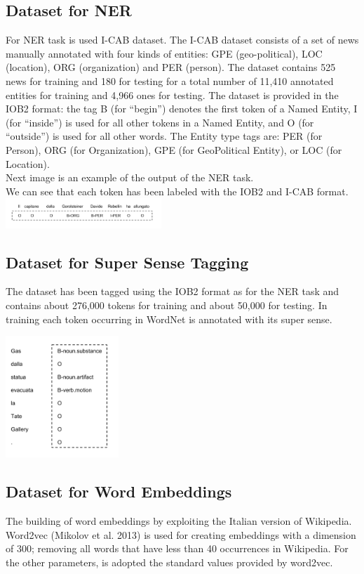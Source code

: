 \documentclass[twocolumn,10pt]{wmrDoc}
\begin{document}
\subsection{Dataset for NER}
For NER task is used I-CAB dataset. The I-CAB dataset consists of a set of news manually annotated
with four kinds of entities: GPE (geo-political), LOC (location), ORG (organization) and
PER (person). The dataset contains 525 news for training and 180 for testing for a total
number of 11,410 annotated entities for training and 4,966 ones for testing. The dataset
is provided in the IOB2 format: the tag B (for “begin”) denotes the first token of a
Named Entity, I (for “inside”) is used for all other tokens in a Named Entity, and O
(for “outside”) is used for all other words. The Entity type tags are: PER (for Person),
ORG (for Organization), GPE (for GeoPolitical Entity), or LOC (for Location). \\
Next image is an example of the output of the NER task.\\
We can see that each token has been labeled with the IOB2 and I-CAB format.\\
\vskip 0.5cm
\includegraphics[width=0.44\textwidth]{figure/nerexample.png}
\vskip0.5cm


\subsection{Dataset for Super Sense Tagging}
The dataset has been tagged using the IOB2 format as for the NER task and contains about 276,000 tokens for training and about 50,000 for testing. In training each token occurring in WordNet is annotated
with its super sense.

\vskip 0.5cm
\includegraphics[width=0.32\textwidth]{figure/sstexample.png}
\vskip0.5cm

\subsection{Dataset for Word Embeddings}
The building of word embeddings by exploiting the Italian version of Wikipedia.
Word2vec \cite{DBLP:journals/corr/abs-1301-3781}(Mikolov et al. 2013) is used for creating embeddings with a dimension of 300; removing all words that have less than 40 occurrences in Wikipedia. For the other parameters, is adopted the standard values provided by word2vec.
\end{document}
